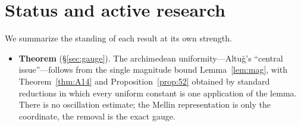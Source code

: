 \documentclass[11pt]{article}
\theoremstyle{definition}
\begin{document}
\section{Status and active research}\label{sec:status}

We summarize the standing of each result at its own strength.

\begin{itemize}
\item \textbf{Theorem} (\S\ref{sec:gauge}). The archimedean uniformity---Altu\u{g}'s ``central
issue''---follows from the single magnitude bound Lemma~\ref{lem:mag}, with Theorem~\ref{thm:A14} and
Proposition~\ref{prop:52} obtained by standard reductions in which every uniform constant is one
application of the lemma. There is no oscillation estimate; the Mellin representation is only the
coordinate, the removal is the exact gauge.


\end{itemize}
\end{document}
